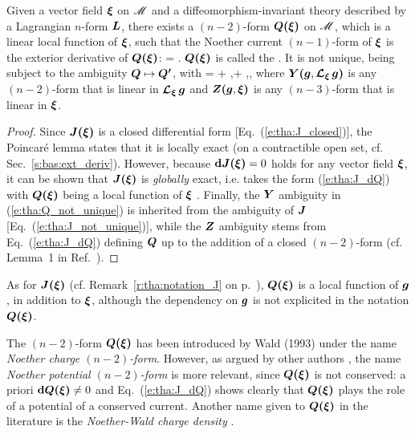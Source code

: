 \begin{prop}
\label{p:tha:Noether_pot_form}
Given a vector field $\bm{\xi}$ on $\mathscr{M}$ and a diffeomorphism-invariant theory described by a Lagrangian $n$-form $\bm{L}$, there exists a $(n-2)$-form $\bm{Q}\textbf{(}\bm{\xi}\textbf{)}$ on $\mathscr{M}$,
which is a linear local function of $\bm{\xi}$, such that
the Noether current $(n-1)$-form of $\bm{\xi}$ is the exterior derivative of $\bm{Q}\textbf{(}\bm{\xi}\textbf{)}$:
\be \label{e:tha:J_dQ}
    \lld\w{\xi}\rld = \dd {}\lld\w{\xi}\rld .
\ee
$\bm{Q}\textbf{(}\bm{\xi}\textbf{)}$ is called the . It is not unique, being subject to the ambiguity
$\bm{Q} \mapsto \bm{Q'}$, with
\be \label{e:tha:Q_not_unique}
    \lld\w{\xi}\rld = \lld\w{\xi}\rld + \lld{},\Lie{\xi}\rld + \dd{}\lld{},\w{\xi}\rld ,
\ee
where $\bm{Y}\textbf{(}\bm{g},\bm{\mathcal{L}}_{\bm{\xi}}\,\bm{g}\textbf{)}$ is any $(n-2)$-form that is linear in $\bm{\mathcal{L}}_{\bm{\xi}}\,\bm{g}$ and
$\bm{Z}\textbf{(}\bm{g},\bm{\xi}\textbf{)} $ is any $(n-3)$-form that is linear in $\bm{\xi}$.
\end{prop}

\begin{proof}
Since $\bm{J}\textbf{(}\bm{\xi}\textbf{)}$ is a closed differential form [Eq.~(\ref{e:tha:J_closed})], the Poincaré lemma
states that it is locally exact (on a contractible open set, cf. Sec.~\ref{s:bas:ext_deriv}). However, because
$\mathbf{d} \bm{J}\textbf{(}\bm{\xi}\textbf{)}  = 0$ holds for any vector field $\bm{\xi}$, it can be shown that
$\bm{J}\textbf{(}\bm{\xi}\textbf{)}$ is \emph{globally} exact, i.e. takes the form (\ref{e:tha:J_dQ})
with $\bm{Q}\textbf{(}\bm{\xi}\textbf{)}$ being a local function of $\bm{\xi}$ \cite{Wald90}.
Finally, the $\bm{Y}$ ambiguity  in (\ref{e:tha:Q_not_unique}) is inherited from the ambiguity of $\bm{J}$ [Eq.~(\ref{e:tha:J_not_unique})], while the $\bm{Z}$ ambiguity stems from Eq.~(\ref{e:tha:J_dQ}) defining
$\bm{Q}$ up to the addition of a closed $(n-2)$-form (cf. Lemma~1 in Ref.~\cite{Wald90}).
\end{proof}

\begin{remark}
\label{r:tha:notation_Q}
As for $\bm{J}\textbf{(}\bm{\xi}\textbf{)}$ (cf. Remark~\ref{r:tha:notation_J} on p.~\pageref{r:tha:notation_J}), $\bm{Q}\textbf{(}\bm{\xi}\textbf{)}$ is a local function of $\bm{g}$, in addition
to $\bm{\xi}$, although the dependency on $\bm{g}$ is not explicited in the notation
$\bm{Q}\textbf{(}\bm{\xi}\textbf{)}$.
\end{remark}

\begin{remark}
The $(n-2)$-form $\bm{Q}\textbf{(}\bm{\xi}\textbf{)}$ has been introduced by Wald (1993) \cite{Wald93} under
the name \emph{Noether charge $(n-2)$-form}. However, as argued by
other authors \cite{JacobKM94,HarloW20}, the name
\emph{Noether potential $(n-2)$-form} is more relevant, since $\bm{Q}\textbf{(}\bm{\xi}\textbf{)}$
is not conserved: a priori $\mathbf{d}\bm{Q}\textbf{(}\bm{\xi}\textbf{)} \neq 0$ and Eq.~(\ref{e:tha:J_dQ}) shows
clearly that $\bm{Q}\textbf{(}\bm{\xi}\textbf{)}$ plays the role of a potential of a conserved current.
Another name given to $\bm{Q}\textbf{(}\bm{\xi}\textbf{)}$ in the literature is
the \emph{Noether-Wald charge density}
\cite{GrumiS22,HajiaS16}.
\end{remark}

